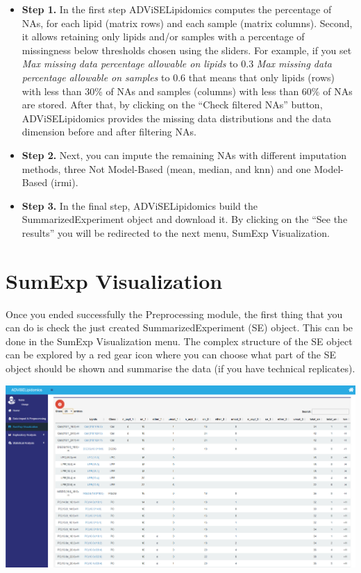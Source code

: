 \documentclass[
]{book}
\providecommand{\tightlist}{%
  \setlength{\itemsep}{0pt}\setlength{\parskip}{0pt}}
\begin{document}
\begin{itemize}
\tightlist
\item
  \textbf{Step 1.} In the first step ADViSELipidomics computes the percentage of NAs, for each lipid (matrix rows) and each sample (matrix columns). Second, it allows retaining only lipids and/or samples with a percentage of missingness below thresholds chosen using the sliders. For example, if you set \emph{Max missing data percentage allowable on lipids} to 0.3 \emph{Max missing data percentage allowable on samples} to 0.6 that means that only lipids (rows) with less than 30\% of NAs and samples (columns) with less than 60\% of NAs are stored. After that, by clicking on the ``Check filtered NAs'' button, ADViSELipidomics provides the missing data distributions and the data dimension before and after filtering NAs.
\item
  \textbf{Step 2.} Next, you can impute the remaining NAs with different imputation methods, three Not Model-Based (mean, median, and knn) and one Model-Based (irmi).
\item
  \textbf{Step 3.} In the final step, ADViSELipidomics build the SummarizedExperiment object and download it. By clicking on the ``See the results'' you will be redirected to the next menu, SumExp Visualization.
\end{itemize}

\hypertarget{sec33}{%
\section{SumExp Visualization}\label{sec33}}

Once you ended successfully the Preprocessing module, the first thing that you can do is check the just created SummarizedExperiment (SE) object. This can be done in the SumExp Visualization menu. The complex structure of the SE object can be explored by a red gear icon where you can choose what part of the SE object should be shown and summarise the data (if you have technical replicates).

\includegraphics[width=1\linewidth]{images/sumexp}
\end{document}
